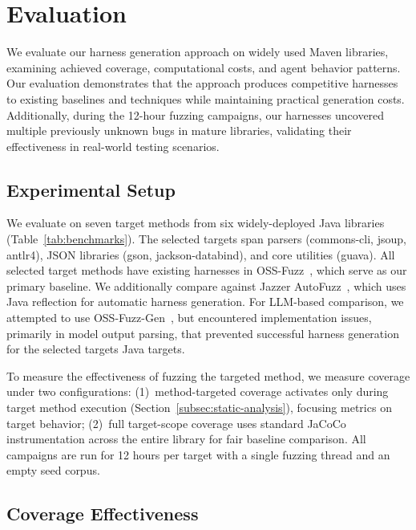 \section{Evaluation}%
\label{sec:evaluation}

We evaluate our harness generation approach on widely used Maven libraries, examining achieved coverage, computational costs, and agent behavior patterns. Our evaluation demonstrates that the approach produces competitive harnesses to existing baselines and techniques while maintaining practical generation costs. Additionally, during the 12-hour fuzzing campaigns, our harnesses uncovered multiple previously unknown bugs in mature libraries, validating their effectiveness in real-world testing scenarios.

\subsection{Experimental Setup}%
\label{subsec:exp-setup}

We evaluate on seven target methods from six widely-deployed Java libraries (Table~\ref{tab:benchmarks}). The selected targets span parsers (commons-cli, jsoup, antlr4), JSON libraries (gson, jackson-databind), and core utilities (guava).
All selected target methods have existing harnesses in OSS-Fuzz~\cite{CITE:OSSFuzz}, which serve as our primary baseline. We additionally compare against Jazzer AutoFuzz~\cite{CITE:Jazzer}, which uses Java reflection for automatic harness generation. For LLM-based comparison, we attempted to use OSS-Fuzz-Gen~\cite{CITE:OSSFuzzGen}, but encountered implementation issues, primarily in model output parsing, that prevented successful harness generation for the selected targets Java targets.
\par
To measure the effectiveness of fuzzing the targeted method, we measure coverage under two configurations: (1)~method-targeted coverage activates only during target method execution (Section~\ref{subsec:static-analysis}), focusing metrics on target behavior; (2)~full target-scope coverage uses standard JaCoCo instrumentation across the entire library for fair baseline comparison.
All campaigns are run for 12 hours per target with a single fuzzing thread and an empty seed corpus. 
\subsection{Coverage Effectiveness}%
\label{subsec:coverage-effectiveness}



